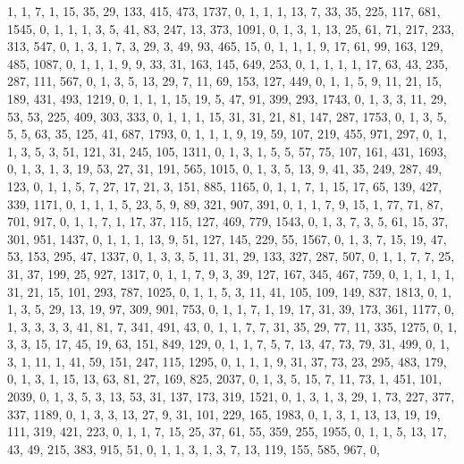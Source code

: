 \begin{code}
\begin{hide}
{     {1, 1, 7, 1, 15, 35, 29, 133, 415, 473, 1737, 0},
     {1, 1, 1, 13, 7, 33, 35, 225, 117, 681, 1545, 0},
     {1, 1, 1, 3, 5, 41, 83, 247, 13, 373, 1091, 0},
     {1, 3, 1, 13, 25, 61, 71, 217, 233, 313, 547, 0},
     {1, 3, 1, 7, 3, 29, 3, 49, 93, 465, 15, 0},
     {1, 1, 1, 9, 17, 61, 99, 163, 129, 485, 1087, 0},
     {1, 1, 1, 9, 9, 33, 31, 163, 145, 649, 253, 0},
     {1, 1, 1, 1, 17, 63, 43, 235, 287, 111, 567, 0},
     {1, 3, 5, 13, 29, 7, 11, 69, 153, 127, 449, 0},
     {1, 1, 5, 9, 11, 21, 15, 189, 431, 493, 1219, 0},
     {1, 1, 1, 15, 19, 5, 47, 91, 399, 293, 1743, 0},
     {1, 3, 3, 11, 29, 53, 53, 225, 409, 303, 333, 0},
     {1, 1, 1, 15, 31, 31, 21, 81, 147, 287, 1753, 0},
     {1, 3, 5, 5, 5, 63, 35, 125, 41, 687, 1793, 0},
     {1, 1, 1, 9, 19, 59, 107, 219, 455, 971, 297, 0},
     {1, 1, 3, 5, 3, 51, 121, 31, 245, 105, 1311, 0},
     {1, 3, 1, 5, 5, 57, 75, 107, 161, 431, 1693, 0},
     {1, 3, 1, 3, 19, 53, 27, 31, 191, 565, 1015, 0},
     {1, 3, 5, 13, 9, 41, 35, 249, 287, 49, 123, 0},
     {1, 1, 5, 7, 27, 17, 21, 3, 151, 885, 1165, 0},
     {1, 1, 7, 1, 15, 17, 65, 139, 427, 339, 1171, 0},
     {1, 1, 1, 5, 23, 5, 9, 89, 321, 907, 391, 0},
     {1, 1, 7, 9, 15, 1, 77, 71, 87, 701, 917, 0},
     {1, 1, 7, 1, 17, 37, 115, 127, 469, 779, 1543, 0},
     {1, 3, 7, 3, 5, 61, 15, 37, 301, 951, 1437, 0},
     {1, 1, 1, 13, 9, 51, 127, 145, 229, 55, 1567, 0},
     {1, 3, 7, 15, 19, 47, 53, 153, 295, 47, 1337, 0},
     {1, 3, 3, 5, 11, 31, 29, 133, 327, 287, 507, 0},
     {1, 1, 7, 7, 25, 31, 37, 199, 25, 927, 1317, 0},
     {1, 1, 7, 9, 3, 39, 127, 167, 345, 467, 759, 0},
     {1, 1, 1, 1, 31, 21, 15, 101, 293, 787, 1025, 0},
     {1, 1, 5, 3, 11, 41, 105, 109, 149, 837, 1813, 0},
     {1, 1, 3, 5, 29, 13, 19, 97, 309, 901, 753, 0},
     {1, 1, 7, 1, 19, 17, 31, 39, 173, 361, 1177, 0},
     {1, 3, 3, 3, 3, 41, 81, 7, 341, 491, 43, 0},
     {1, 1, 7, 7, 31, 35, 29, 77, 11, 335, 1275, 0},
     {1, 3, 3, 15, 17, 45, 19, 63, 151, 849, 129, 0},
     {1, 1, 7, 5, 7, 13, 47, 73, 79, 31, 499, 0},
     {1, 3, 1, 11, 1, 41, 59, 151, 247, 115, 1295, 0},
     {1, 1, 1, 9, 31, 37, 73, 23, 295, 483, 179, 0},
     {1, 3, 1, 15, 13, 63, 81, 27, 169, 825, 2037, 0},
     {1, 3, 5, 15, 7, 11, 73, 1, 451, 101, 2039, 0},
     {1, 3, 5, 3, 13, 53, 31, 137, 173, 319, 1521, 0},
     {1, 3, 1, 3, 29, 1, 73, 227, 377, 337, 1189, 0},
     {1, 3, 3, 13, 27, 9, 31, 101, 229, 165, 1983, 0},
     {1, 3, 1, 13, 13, 19, 19, 111, 319, 421, 223, 0},
     {1, 1, 7, 15, 25, 37, 61, 55, 359, 255, 1955, 0},
     {1, 1, 5, 13, 17, 43, 49, 215, 383, 915, 51, 0},
     {1, 1, 3, 1, 3, 7, 13, 119, 155, 585, 967, 0},
}
\end{hide}
\end{code}
